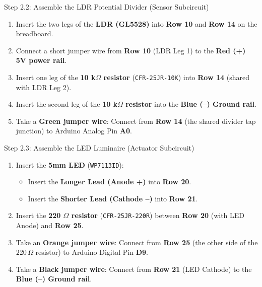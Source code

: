 \documentclass[12pt,a4paper]{article}
\begin{document}
\begin{stepbox}{Step 2.2: Assemble the LDR Potential Divider (Sensor Subcircuit)}
\begin{enumerate}
    \item Insert the two legs of the \textbf{LDR (GL5528)} into \textbf{Row 10} and \textbf{Row 14} on the breadboard.
    \item Connect a short jumper wire from \textbf{Row 10} (LDR Leg 1) to the \textbf{Red (+) 5V power rail}.
    \item Insert one leg of the \textbf{10 k$\Omega$ resistor} (\texttt{CFR-25JR-10K}) into \textbf{Row 14} (shared with LDR Leg 2).
    \item Insert the second leg of the \textbf{10 k$\Omega$ resistor} into the \textbf{Blue (--) Ground rail}.
    \item Take a \textbf{Green jumper wire}: Connect from \textbf{Row 14} (the shared divider tap junction) to Arduino Analog Pin \textbf{A0}.
\end{enumerate}
\end{stepbox}

\begin{stepbox}{Step 2.3: Assemble the LED Luminaire (Actuator Subcircuit)}
\begin{enumerate}
    \item Insert the \textbf{5mm LED} (\texttt{WP7113ID}):
    \begin{itemize}
        \item Insert the \textbf{Longer Lead (Anode +)} into \textbf{Row 20}.
        \item Insert the \textbf{Shorter Lead (Cathode --)} into \textbf{Row 21}.
    \end{itemize}
    \item Insert the \textbf{220 $\Omega$ resistor} (\texttt{CFR-25JR-220R}) between \textbf{Row 20} (with LED Anode) and \textbf{Row 25}.
    \item Take an \textbf{Orange jumper wire}: Connect from \textbf{Row 25} (the other side of the $220\,\Omega$ resistor) to Arduino Digital Pin \textbf{D9}.
    \item Take a \textbf{Black jumper wire}: Connect from \textbf{Row 21} (LED Cathode) to the \textbf{Blue (--) Ground rail}.
\end{enumerate}
\end{stepbox}
\end{document}

